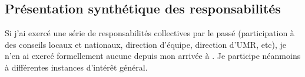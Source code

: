 \subsection{Présentation synthétique des responsabilités}

Si j'ai exercé une série de responsabilités collectives par le passé (participation à des conseils locaux et nationaux, direction d'équipe, direction d’UMR, etc), je n’en ai exercé formellement aucune depuis mon arrivée à \SU. Je participe néanmoins à différentes instances d’intérêt général.


% 

